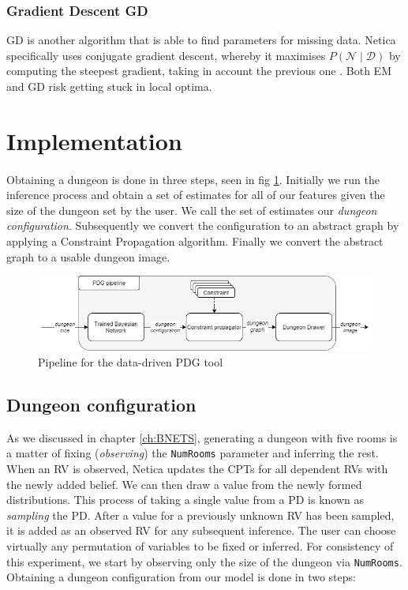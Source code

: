 \documentclass{UoYCSproject}
\begin{document}
\subsubsection{Gradient Descent GD}
GD is another algorithm that is able to find parameters for missing data. Netica specifically uses conjugate gradient descent, whereby it maximises \(P(\mathcal{N} \mid \mathcal{D})\) by computing the steepest gradient, taking in account the previous one \parencite[p47]{neticaCman}. Both EM and GD risk getting stuck in local optima.

\section{Implementation}
\label{sec:implementation}
\paragraph{}
Obtaining a dungeon is done in three steps, seen in fig \ref{fig:PDGPipeline}. Initially we run the inference process and obtain a set of estimates for all of our features given the size of the dungeon set by the user. We call the set of estimates our \textit{dungeon configuration}. Subsequently we convert the configuration to an abstract graph by applying a Constraint Propagation algorithm. Finally we convert the abstract graph to a usable dungeon image.

\begin{figure}[htb]
  \centering
    \includegraphics[width=\textwidth]{figures/BPDG_flow.png}
    \caption{Pipeline for the data-driven PDG tool}
  \label{fig:PDGPipeline}
\end{figure}

\subsection{Dungeon configuration}
As we discussed in chapter \ref{ch:BNETS}, generating a dungeon with five rooms is a matter of fixing (\textit{observing}) the \texttt{NumRooms} parameter and inferring the rest. When an RV is observed, Netica updates the CPTs for all dependent RVs with the newly added belief. We can then draw a value from the newly formed distributions. This process of taking a single value from a PD is known as \textit{sampling} the PD. After a value for a previously unknown RV has been sampled, it is added as an observed RV for any subsequent inference. The user can choose virtually any permutation of variables to be fixed or inferred. For consistency of this experiment, we start by observing only the size of the dungeon via \texttt{NumRooms}. Obtaining a dungeon configuration from our model is done in two steps:
\end{document}
